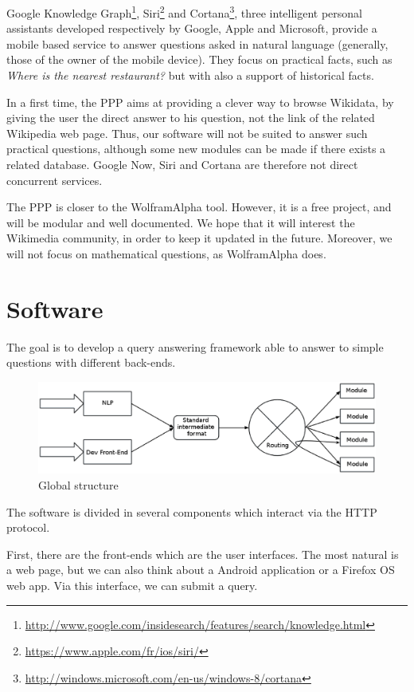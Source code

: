 \documentclass[a4paper,10pt]{article}
\begin{document}
Google Knowledge Graph\footnote{\url{http://www.google.com/insidesearch/features/search/knowledge.html}}, Siri\footnote{\url{https://www.apple.com/fr/ios/siri/}} and Cortana\footnote{\url{http://windows.microsoft.com/en-us/windows-8/cortana}},
three intelligent personal assistants
developed respectively by Google, Apple and Microsoft, provide a mobile based service to 
answer questions asked in natural language (generally, those of the owner of the
mobile device). They focus on practical facts, such as \emph{Where is the nearest
restaurant?} but with also a support of historical facts.

In a first time, the PPP aims at providing a clever way to browse Wikidata, by giving the 
user the direct answer to his question, not the link of the related Wikipedia
web page. Thus, our software will not be suited to answer such practical questions,
although some new modules can be made if there exists a related database. Google Now, Siri
and Cortana are therefore not direct concurrent services.

The PPP is closer to the WolframAlpha tool. However, it is a free project,
and will be modular and well documented. We hope that it will interest the 
Wikimedia community, in order to keep it updated in the future. Moreover,
we will not focus on mathematical questions, as WolframAlpha does.

\section{Software}

The goal is to develop a query answering framework able to answer to simple questions with different back-ends. 

\begin{figure}[!ht]
    \centering
    \includegraphics[scale=0.40]{images/Structure-PPP-en.eps}
    \caption{Global structure}
\end{figure}

The software is divided in several components which interact via the HTTP protocol.

First, there are the front-ends which are the user interfaces. The most natural is
a web page, but we can also think about a Android application
or a Firefox OS web app. Via this interface, we can submit a query.
\end{document}
